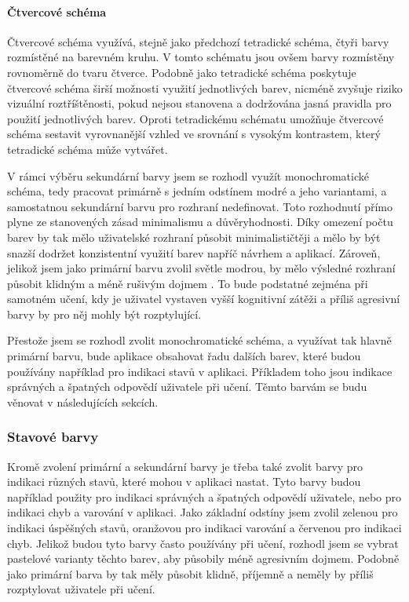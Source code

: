 \paragraph{Čtvercové schéma} Čtvercové schéma využívá, stejně jako předchozí tetradické schéma, čtyři barvy rozmístěné na barevném kruhu. V tomto schématu jsou ovšem barvy rozmístěny rovnoměrně do tvaru čtverce. Podobně jako tetradické schéma poskytuje čtvercové schéma širší možnosti využití jednotlivých barev, nicméně zvyšuje riziko vizuální roztříštěnosti, pokud nejsou stanovena a dodržována jasná pravidla pro použití jednotlivých barev. Oproti tetradickému schématu umožňuje čtvercové schéma sestavit vyrovnanější vzhled ve srovnání s vysokým kontrastem, který tetradické schéma může vytvářet. \cite{FigmaColorWheel}

V rámci výběru sekundární barvy jsem se rozhodl využít monochromatické schéma, tedy pracovat primárně s jedním odstínem modré a jeho variantami, a samostatnou sekundární barvu pro rozhraní nedefinovat. Toto rozhodnutí přímo plyne ze stanovených zásad minimalismu a důvěryhodnosti. Díky omezení počtu barev by tak mělo uživatelské rozhraní působit minimalističtěji a mělo by být snazší dodržet konzistentní využití barev napříč návrhem a aplikací. Zároveň, jelikož jsem jako primární barvu zvolil světle modrou, by mělo výsledné rozhraní působit klidným a méně rušivým dojmem \cite{FigmaLightBlue}. To bude podstatné zejména při samotném učení, kdy je uživatel vystaven vyšší kognitivní zátěži a příliš agresivní barvy by pro něj mohly být rozptylující.

Přestože jsem se rozhodl zvolit monochromatické schéma, a využívat tak hlavně primární barvu, bude aplikace obsahovat řadu dalších barev, které budou používány například pro indikaci stavů v aplikaci. Příkladem toho jsou indikace správných a špatných odpovědí uživatele při učení. Těmto barvám se budu věnovat v následujících sekcích.

\subsubsection{Stavové barvy}

Kromě zvolení primární a sekundární barvy je třeba také zvolit barvy pro indikaci různých stavů, které mohou v aplikaci nastat. Tyto barvy budou například použity pro indikaci správných a špatných odpovědí uživatele, nebo pro indikaci chyb a varování v aplikaci. Jako základní odstíny jsem zvolil zelenou pro indikaci úspěšných stavů, oranžovou pro indikaci varování a červenou pro indikaci chyb. Jelikož budou tyto barvy často používány při učení, rozhodl jsem se vybrat pastelové varianty těchto barev, aby působily méně agresivním dojmem. Podobně jako primární barva by tak měly působit klidně, příjemně a neměly by příliš rozptylovat uživatele při učení.

